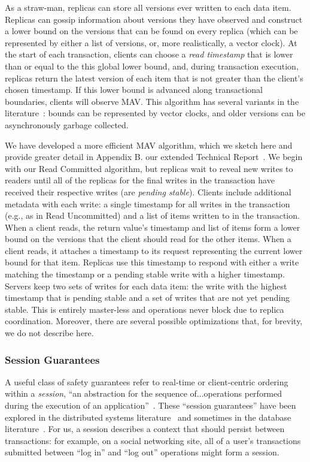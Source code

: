 As a straw-man, replicas can store all versions ever written to each
data item. Replicas can gossip information about versions they have
observed and construct a lower bound on the versions that can be found
on every replica (which can be represented by either a list of
versions, or, more realistically, a vector clock). At the start of
each transaction, clients can choose a \textit{read timestamp} that is
lower than or equal to the this global lower bound, and, during
transaction execution, replicas return the latest version of each item
that is not greater than the client's chosen timestamp. If this lower
bound is advanced along transactional boundaries, clients will observe
MAV. This algorithm has several variants in the
literature~\cite{readonly, swift}: bounds can be represented by vector
clocks, and older versions can be asynchronously garbage collected.

We have developed a more efficient MAV algorithm, which we sketch here
and provide greater detail in
\iftechreport
 Appendix B.
\else
 our extended Technical Report~\cite{hat-tr}.
\fi
We begin with our Read
Committed algorithm, but replicas wait to reveal new writes to readers
until all of the replicas for the final writes in the transaction have
received their respective writes (are \textit{pending
  stable}). Clients include additional metadata with each write: a
single timestamp for all writes in the transaction (e.g., as in Read
Uncommitted) and a list of items written to in the transaction. When a
client reads, the return value's timestamp and list of items form a
lower bound on the versions that the client should read for the other
items. When a client reads, it attaches a timestamp to its request
representing the current lower bound for that item. Replicas use this
timestamp to respond with either a write matching the timestamp or a
pending stable write with a higher timestamp. Servers keep two sets of
writes for each data item: the write with the highest timestamp that
is pending stable and a set of writes that are not yet pending
stable. This is entirely master-less and operations never block due to
replica coordination. Moreover, there are several possible
optimizations that, for brevity, we do not describe here.



\subsubsection{Session Guarantees}

A useful class of safety guarantees refer to real-time or
client-centric ordering within a \textit{session}, ``an abstraction
for the sequence of...operations performed during the execution of an
application''~\cite{sessionguarantees}. These ``session guarantees''
have been explored in the distributed systems
literature~\cite{sessionguarantees,vogels-defs} and sometimes in the
database literature~\cite{daudjee-session}. For us, a session
describes a context that should persist between transactions: for
example, on a social networking site, all of a user's transactions
submitted between ``log in'' and ``log out'' operations might form a
session.

